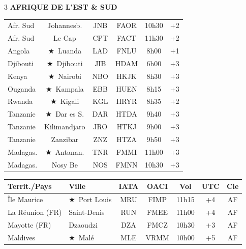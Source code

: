 \documentclass[9pt,a4paper,landscape]{article}
\newcommand{\sectionbanner}[2]{%
\noindent\colorbox{#1}{\parbox{\dimexpr\textwidth-2\fboxsep}{%
\vspace{3pt}\hspace{6pt}{\Large\bfseries\color{white}#2}\vspace{3pt}}}%
\vspace{4pt}%
}
\newcommand{\CAP}{\textcolor{capgold}{$\bigstar$}}
\begin{document}
\begin{multicols}{3}
\vspace{0.15cm}
\textbf{\color{afrgreen}AFRIQUE DE L'EST \& SUD}\\[-0.1cm]
\begin{tabular}{@{}l c c c c c@{}}
\toprule
\rowcolor{afrlight} Afr. Sud & Johannesb. & JNB & FAOR & 10h30 & +2 \\
Afr. Sud & Le Cap & CPT & FACT & 11h30 & +2 \\
\rowcolor{afrlight} Angola & \CAP\ Luanda & LAD & FNLU & 8h00 & +1 \\
Djibouti & \CAP\ Djibouti & JIB & HDAM & 6h00 & +3 \\
\rowcolor{afrlight} Kenya & \CAP\ Nairobi & NBO & HKJK & 8h30 & +3 \\
Ouganda & \CAP\ Kampala & EBB & HUEN & 8h15 & +3 \\
\rowcolor{afrlight} Rwanda & \CAP\ Kigali & KGL & HRYR & 8h35 & +2 \\
Tanzanie & \CAP\ Dar es S. & DAR & HTDA & 9h40 & +3 \\
\rowcolor{afrlight} Tanzanie & Kilimandjaro & JRO & HTKJ & 9h00 & +3 \\
Tanzanie & Zanzibar & ZNZ & HTZA & 9h50 & +3 \\
\rowcolor{afrlight} Madagas. & \CAP\ Antanan. & TNR & FMMI & 11h00 & +3 \\
Madagas. & Nosy Be & NOS & FMNN & 10h30 & +3 \\
\bottomrule
\end{tabular}

\end{multicols}

\sectionbanner{omcolor}{OCÉAN INDIEN}

\begin{center}
\scriptsize
\begin{tabular}{@{}l l c c c c c@{}}
\toprule
\textbf{Territ./Pays} & \textbf{Ville} & \textbf{IATA} & \textbf{OACI} & \textbf{Vol} & \textbf{UTC} & \textbf{Cie} \\
\midrule
\rowcolor{omlight} Île Maurice & \CAP\ Port Louis & MRU & FIMP & 11h15 & +4 & AF \\
La Réunion (FR) & Saint-Denis & RUN & FMEE & 11h00 & +4 & AF \\
\rowcolor{omlight} Mayotte (FR) & Dzaoudzi & DZA & FMCZ & 10h30 & +3 & AF \\
Maldives & \CAP\ Malé & MLE & VRMM & 10h00 & +5 & AF \\
\bottomrule
\end{tabular}
\end{center}
\end{document}
